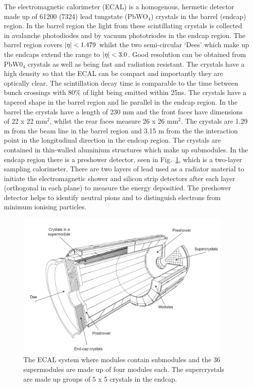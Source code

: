 The electromagnetic calorimeter (ECAL) is a homogenous, hermetic detector made up of 61200 (7324) lead tungstate (PbWO$_{4}$) crystals in the barrel (endcap) region. In the barrel region the light from these scintillating crystals is collected in avalanche photodiodes and by vacuum phototriodes in the endcap region. The barrel region covers $\lvert \eta \rvert<1.479$ whilst the two semi-circular `Dees' which make up the endcaps extend the range to $\lvert \eta \rvert<3.0$. Good resolution can be obtained from PbW0$_{4}$ crystals as well as being fast and radiation resistant. The crystals have a high density so that the ECAL can be compact and importantly they are optically clear. The scintillation decay time is comparable to the time between bunch crossings with 80\% of light being emitted within 25ns. The crystals have a tapered shape in the barrel region and lie parallel in the endcap region. In the barrel the crystals have a length of 230 mm and the front faces have dimensions of 22 x 22 mm$^{2}$, whilst the rear faces measure 26 x 26 mm$^{2}$. The crystals are 1.29 m from the beam line in the barrel region and 3.15 m from the the interaction point in the longitudinal direction in the endcap region. The crystals are contained in thin-walled aluminium structures which make up submodules. In the endcap region there is a preshower detector, seen in Fig.~\ref{fig:ecal}, which is a two-layer sampling calorimeter. There are two layers of lead used as a radiator material to initiate the electromagnetic shower and silicon strip detectors after each layer (orthogonal in each plane) to measure the energy depositied. The preshower detector helps to identify neutral pions and to distinguish electrons from minimum ionising particles.

\begin{figure}[ht!]
\centering
    \includegraphics[width=0.95\textwidth]{images/ecal.png}
    \caption{The ECAL system where modules contain submodules and the 36 supermodules are made up of four modules each. The supercrystals are made up groups of 5 x 5 crystals in the endcap.}
    \label{fig:ecal}
\end{figure}

